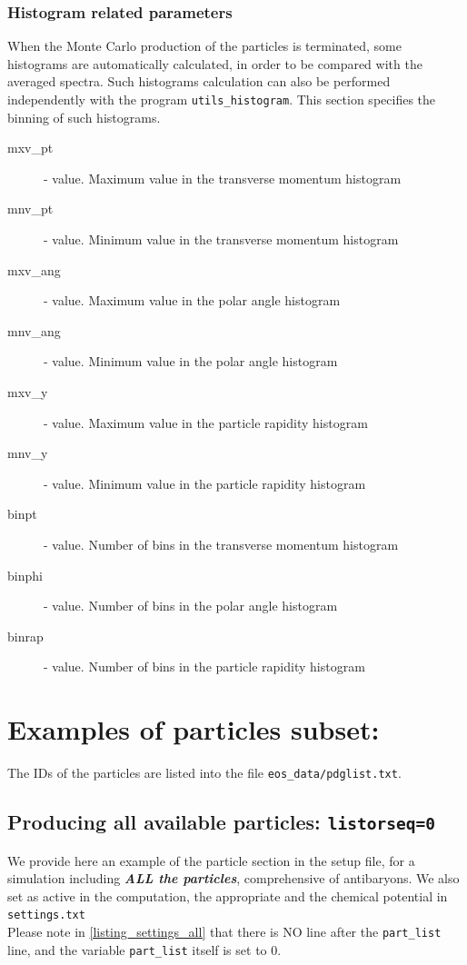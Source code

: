 \subsubsection{Histogram related parameters}\label{sec:histogram}
When the Monte Carlo production of the particles is terminated, some histograms are automatically calculated, in order to be compared with the averaged spectra.
Such histograms calculation can also be performed independently with the program {\tt utils\_histogram}. This section specifies the binning of such histograms.
\begin{description}
 \item[mxv\_pt]  \real - value. Maximum value in the transverse momentum histogram
 \item[mnv\_pt]  \real - value. Minimum value in the transverse momentum histogram
 \item[mxv\_ang] \real - value. Maximum value in the polar angle histogram
 \item[mnv\_ang] \real - value. Minimum value in the polar angle histogram
 \item[mxv\_y]   \real - value. Maximum value in the   particle rapidity histogram 
 \item[mnv\_y]   \real - value. Minimum value in the particle rapidity histogram 
 \item[binpt]  \integer - value.   Number of bins in the   transverse momentum histogram
 \item[binphi] \integer - value.   Number of bins in the polar angle       histogram
 \item[binrap] \integer - value.   Number of bins in the particle rapidity    histogram
\end{description}


\section{Examples of particles subset:}\label{sec:examples}
The IDs of the particles are listed into the file {\tt eos\_data/pdglist.txt}.

\subsection{Producing all available particles: {\tt listorseq=0}}
We provide here an example of the particle section in the setup file, 
for a simulation including \textit{\textbf{ALL the particles}}, comprehensive of antibaryons.
We also set as active in the computation, the appropriate and the chemical potential in {\tt settings.txt}\\
Please note in \ref{listing_settings_all} that there is NO line after the {\tt part\_list} line, and the 
variable {\tt part\_list} itself is set to 0.\\


